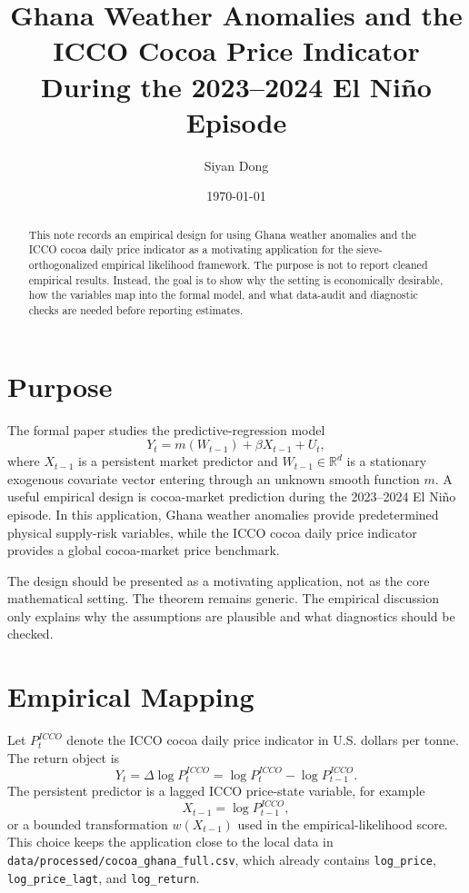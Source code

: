 \documentclass[11pt]{article}
\title{Ghana Weather Anomalies and the ICCO Cocoa Price Indicator During the 2023--2024 El Ni\~no Episode}
\author{Siyan Dong}
\date{\today}
\begin{document}
\maketitle

\begin{abstract}
This note records an empirical design for using Ghana weather anomalies and the ICCO cocoa daily price indicator as a motivating application for the sieve-orthogonalized empirical likelihood framework. The purpose is not to report cleaned empirical results. Instead, the goal is to show why the setting is economically desirable, how the variables map into the formal model, and what data-audit and diagnostic checks are needed before reporting estimates.
\end{abstract}

\section{Purpose}

The formal paper studies the predictive-regression model
\begin{equation}
    Y_t=m(W_{t-1})+\beta X_{t-1}+U_t,
    \label{eq:design-model}
\end{equation}
where \(X_{t-1}\) is a persistent market predictor and \(W_{t-1}\in\mathbb R^d\) is a stationary exogenous covariate vector entering through an unknown smooth function \(m\). A useful empirical design is cocoa-market prediction during the 2023--2024 El Ni\~no episode. In this application, Ghana weather anomalies provide predetermined physical supply-risk variables, while the ICCO cocoa daily price indicator provides a global cocoa-market price benchmark.

The design should be presented as a motivating application, not as the core mathematical setting. The theorem remains generic. The empirical discussion only explains why the assumptions are plausible and what diagnostics should be checked.

\section{Empirical Mapping}

Let \(P_t^{ICCO}\) denote the ICCO cocoa daily price indicator in U.S. dollars per tonne. The return object is
\begin{equation}
    Y_t=\Delta\log P_t^{ICCO}
        =\log P_t^{ICCO}-\log P_{t-1}^{ICCO}.
\end{equation}
The persistent predictor is a lagged ICCO price-state variable, for example
\begin{equation}
    X_{t-1}=\log P_{t-1}^{ICCO},
\end{equation}
or a bounded transformation \(w(X_{t-1})\) used in the empirical-likelihood score. This choice keeps the application close to the local data in \texttt{data/processed/cocoa\_ghana\_full.csv}, which already contains \texttt{log\_price}, \texttt{log\_price\_lagt}, and \texttt{log\_return}.
\end{document}
